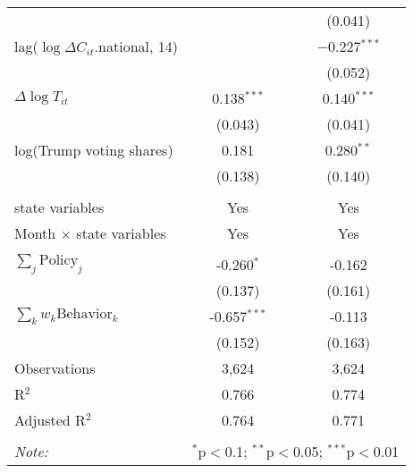 \begin{tabular}{@{\extracolsep{1pt}}lcc}
  &  & (0.041) \\ 
  lag($\log \Delta C_{it}$.national, 14) &  & $-$0.227$^{***}$ \\ 
  &  & (0.052) \\ 
  $\Delta \log T_{it}$ & 0.138$^{***}$ & 0.140$^{***}$ \\ 
  & (0.043) & (0.041) \\ 
  log(Trump voting shares) & 0.181 & 0.280$^{**}$ \\ 
  & (0.138) & (0.140) \\ 
 \hline \\[-1.8ex] 
state variables & Yes & Yes \\ 
Month $\times$ state variables & Yes & Yes \\ 
\hline \\[-1.8ex] 
$\sum_j \mathrm{Policy}_j$ & -0.260$^{*}$ & -0.162 \\ 
 & (0.137) & (0.161) \\ 
$\sum_k w_k \mathrm{Behavior}_k$ & -0.657$^{***}$ & -0.113 \\ 
 & (0.152) & (0.163) \\ 
Observations & 3,624 & 3,624 \\ 
R$^{2}$ & 0.766 & 0.774 \\ 
Adjusted R$^{2}$ & 0.764 & 0.771 \\ 
\hline 
\hline \\[-1.8ex] 
\textit{Note:}  & \multicolumn{2}{r}{$^{*}$p$<$0.1; $^{**}$p$<$0.05; $^{***}$p$<$0.01} \\ 
\end{tabular} 